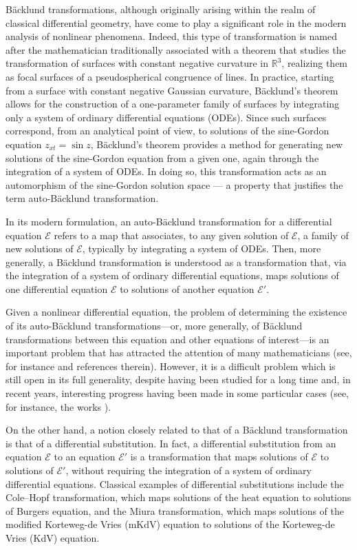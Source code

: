 \documentclass[12pt,english]{elsarticle}
\theoremstyle{plain}
\theoremstyle{plain}
\theoremstyle{remark}
\theoremstyle{plain}
\theoremstyle{definition}
\theoremstyle{definition}
\begin{document}
B\"{a}cklund transformations, although originally arising within the realm
of classical differential geometry, have come to play a significant role
in the modern analysis of nonlinear phenomena. Indeed, this type of transformation
is named after the mathematician traditionally associated with a theorem
that studies the transformation of surfaces with constant negative curvature
in $\mathbb{R}^{3}$, realizing them as focal surfaces of a pseudospherical
congruence of lines. In practice, starting from a surface with constant
negative Gaussian curvature, B\"{a}cklund's theorem allows for the construction
of a one-parameter family of surfaces by integrating only a system of ordinary
differential equations (ODEs). Since such surfaces correspond, from an
analytical point of view, to solutions of the sine-Gordon equation
$z_{xt}=\sin z$, B\"{a}cklund's theorem provides a method for generating
new solutions of the sine-Gordon equation from a given one, again through
the integration of a system of ODEs. In doing so, this transformation acts
as an automorphism of the sine-Gordon solution space --- a property that
justifies the term auto-B\"{a}cklund transformation.

In its modern formulation, an auto-B\"{a}cklund transformation for a differential
equation $\mathcal{E}$ refers to a map that associates, to any given solution
of $\mathcal{E}$, a family of new solutions of $\mathcal{E}$, typically
by integrating a system of ODEs. Then, more generally, a B\"{a}cklund transformation
is understood as a transformation that, via the integration of a system
of ordinary differential equations, maps solutions of one differential
equation $\mathcal{E}$ to solutions of another equation
$\mathcal{E}'$.

Given a nonlinear differential equation, the problem of determining the
existence of its auto-B\"{a}cklund transformations---or, more generally,
of B\"{a}cklund transformations between this equation and other equations
of interest---is an important problem that has attracted the attention
of many mathematicians (see, for instance
\cite{And-Ibr,Lab74,Lamb80,Nimmo,Pirani1,Rogers-Schief,Zvyagin} and references
therein). However, it is a difficult problem which is still open in its
full generality, despite having been studied for a long time and, in recent
years, interesting progress having been made in some particular cases (see,
for instance, the works
\cite{AndFel2015,AndFel2016,Clelland2002,Clelland2009,Clelland2018,Yuhao1,Yuhao2}).

On the other hand, a notion closely related to that of a B\"{a}cklund transformation
is that of a differential substitution. In fact, a differential substitution
from an equation $\mathcal{E}$ to an equation $\mathcal{E}'$ is a transformation
that maps solutions of $\mathcal{E}$ to solutions of $\mathcal{E}'$, without
requiring the integration of a system of ordinary differential equations.
Classical examples of differential substitutions include the Cole--Hopf
transformation, which maps solutions of the heat equation to solutions
of Burgers equation, and the Miura transformation, which maps solutions
of the modified Korteweg-de Vries (mKdV) equation to solutions of the Korteweg-de
Vries (KdV) equation.
\end{document}
